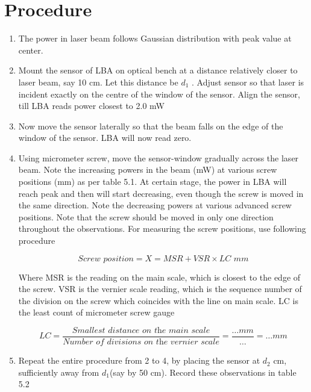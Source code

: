 \documentclass[11pt]{article}
\begin{document}
\section{Procedure}
	
	\begin{enumerate}
	
	\item The power in laser beam follows Gaussian distribution with peak value at center.
 
	\item Mount the sensor of LBA on optical bench at a distance relatively closer to laser beam,
 say 10 cm. Let this distance be  $d_1$ . Adjust sensor so that laser is incident exactly on the
 centre of the window of the sensor. Align the sensor, till LBA reads power closest to 2.0
 mW
 \item Now move the sensor laterally so that the beam falls on the edge of the window of the
 sensor. LBA will now read zero.

 \item Using micrometer screw, move the sensor-window gradually across the laser beam. Note
 the increasing powers in the beam (mW) at various screw positions (mm) as per table 5.1. At certain stage, the power in LBA will reach peak and then will start decreasing,
 even though the screw is moved in the same direction. Note the decreasing powers at
 various advanced screw positions. Note that the screw should be moved in only one
 direction throughout the observations. For measuring the screw positions, use following
 procedure

	\begin{equation}
		\textit{Screw position} = X = MSR + VSR \times LC \textit{ mm}
	\end{equation}

	Where MSR is the reading on the main scale, which is
closest to the edge of the screw. VSR is the vernier scale
reading, which is the sequence number of the division on
the screw which coincides with the line on main scale.
LC is the least count of micrometer screw gauge

\begin{equation}
	LC = \frac{\textit{Smallest distance on the main scale}}{\textit{Number of divisions on the vernier scale}} = \frac{\dots mm}{\dots} = \dots mm
\end{equation}


\item Repeat the entire procedure from 2 to 4, by placing the sensor at  $d_2$ cm, sufficiently away
from  $d_1$(say by 50 cm). Record these observations in table 5.2



\end{enumerate}
\end{document}
